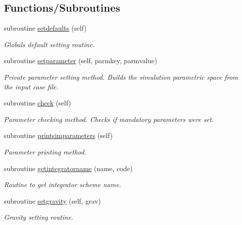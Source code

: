 \subsection*{Functions/\+Subroutines}
\begin{DoxyCompactItemize}
\item 
subroutine \hyperlink{namespacesimulation__globals__mod_ac2ac06271de377004c67b6ba2f3ed353}{setdefaults} (self)
\begin{DoxyCompactList}\small\item\em Globals default setting routine. \end{DoxyCompactList}\item 
subroutine \hyperlink{namespacesimulation__globals__mod_a8a05831d4c3e3eb5741d65978f6fcf61}{setparameter} (self, parmkey, parmvalue)
\begin{DoxyCompactList}\small\item\em Private parameter setting method. Builds the simulation parametric space from the input case file. \end{DoxyCompactList}\item 
subroutine \hyperlink{namespacesimulation__globals__mod_a41249abb5c33ef9e8bff448f0b3826fa}{check} (self)
\begin{DoxyCompactList}\small\item\em Parameter checking method. Checks if mandatory parameters were set. \end{DoxyCompactList}\item 
subroutine \hyperlink{namespacesimulation__globals__mod_a97c04d0289a9f2d004a9329cb7ab16f0}{printsimparameters} (self)
\begin{DoxyCompactList}\small\item\em Parameter printing method. \end{DoxyCompactList}\item 
subroutine \hyperlink{namespacesimulation__globals__mod_a68e871ed8e5d3930884e968c6fdafddc}{getintegratorname} (name, code)
\begin{DoxyCompactList}\small\item\em Routine to get integrator scheme name. \end{DoxyCompactList}\item 
subroutine \hyperlink{namespacesimulation__globals__mod_a9e92dfed4ef7388208adce768f064554}{setgravity} (self, grav)
\begin{DoxyCompactList}\small\item\em Gravity setting routine. \end{DoxyCompactList}\item 

\end{DoxyCompactItemize}

